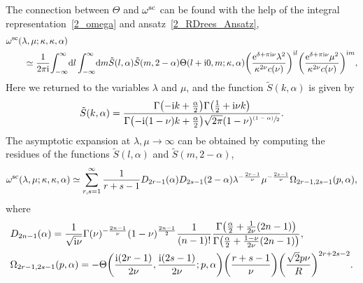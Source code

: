 \documentclass[pdftex]{sigma}
\numberwithin{equation}{section}
\begin{document}
The connection between $\Theta$ and $\omega^{{\rm sc}}$ can be found with the help of the integral representation~\eqref{2_omega} and ansatz~\eqref{2_RDrees_Ansatz},
\begin{align*}
&\omega^{{\rm sc}}(\lambda, \mu; \kappa, \kappa, \alpha) \\
&\qquad{}\simeq\frac{1}{2\pi {\rm i}}\! \int_{-\infty}^{\infty} \! {\rm d}l \int_{-\infty}^{\infty}\! {\rm d}m
\tilde{S}(l, \alpha) \tilde{S}(m, 2-\alpha) \Theta(l+{\rm i}0, m; \kappa, \alpha)
\biggl(\frac{{\rm e}^{\delta+\pi {\rm i} \nu}\lambda^2}{\kappa^{2\nu} c(\nu)}\biggr)^{{\rm i}l}
\biggl(\frac{{\rm e}^{\delta+\pi {\rm i} \nu}\mu^2}{\kappa^{2\nu}  c(\nu)}\biggr)^{{\rm i}m}, \nonumber
\end{align*}
Here we returned to the variables $\lambda$ and $\mu$, and the function $\tilde{S}(k, \alpha)$ is given by
\begin{align*}
\tilde{S}(k, \alpha)=\frac{\Gamma\bigl(-{\rm i}k+\frac{\alpha}{2}\bigr) \Gamma\bigl(\frac{1}{2}+{\rm i}\nu k\bigr)}{\Gamma\bigl(-{\rm i}(1-\nu)k+\frac{\alpha}{2}\bigr) \sqrt{2\pi}(1-\nu)^{\sfrac{(1-\alpha)}{2}}}.
\end{align*}
The asymptotic expansion at $\lambda, \mu \rightarrow \infty$ can be obtained by computing the residues of the functions $\tilde{S}(l, \alpha)$ and $\tilde{S}(m, 2-\alpha)$,
\begin{align*}
\omega^{{\rm sc}}(\lambda, \mu; \kappa, \kappa, \alpha) \simeq
\sum_{r, s=1}^{\infty} \frac{1}{r+s-1} D_{2r-1}(\alpha) D_{2s-1}(2-\alpha)
\lambda^{-\frac{2r-1}{\nu}} \mu^{-\frac{2s-1}{\nu}}
\Omega_{2r-1, 2s-1}(p, \alpha),
\end{align*}
where
\begin{align*}
&D_{2n-1}(\alpha)=\frac{1}{\sqrt{{\rm i}\nu}} \Gamma(\nu)^{-\frac{2n-1}{\nu}} (1-\nu)^{\frac{2n-1}{2}} \frac{1}{(n-1)!}
\frac{\Gamma\bigl(\frac{\alpha}{2}+\frac{1}{2\nu}(2n-1)\bigr)}{\Gamma\bigl(\frac{\alpha}{2}+\frac{1-\nu}{2\nu}(2n-1)\bigr)},
\\
&\Omega_{2r-1, 2s-1}(p, \alpha)=
-\Theta\biggl(\frac{{\rm i}(2r-1)}{2\nu}, \frac{{\rm i}(2s-1)}{2\nu}; p, \alpha \biggr)
\biggl(\frac{r+s-1}{\nu}\biggr)
\biggl(\frac{\sqrt{2}p\nu}{R}\biggr)^{2r+2s-2}.
\end{align*}
\end{document}
